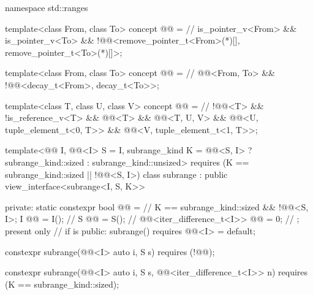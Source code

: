 %
\begin{codeblock}
namespace std::ranges {
  template<class From, class To>
    concept @@ =      // \expos
      is_pointer_v<From> && is_pointer_v<To> &&
      !@@<remove_pointer_t<From>(*)[], remove_pointer_t<To>(*)[]>;

  template<class From, class To>
    concept @@ =                    // \expos
      @@<From, To> &&
      !@@<decay_t<From>, decay_t<To>>;

  template<class T, class U, class V>
    concept @@ =                    // \expos
      !@@<T> && !is_reference_v<T> && @@<T> &&
      @@<T, U, V> &&
      @@<U, tuple_element_t<0, T>> &&
      @@<V, tuple_element_t<1, T>>;

  template<@@ I, @@<I> S = I, subrange_kind K =
      @@<S, I> ? subrange_kind::sized : subrange_kind::unsized>
    requires (K == subrange_kind::sized || !@@<S, I>)
  class subrange : public view_interface<subrange<I, S, K>> {
  private:
    static constexpr bool @@ =                       // \expos
      K == subrange_kind::sized && !@@<S, I>;
    I @@ = I();                                         // \expos
    S @@ = S();                                           // \expos
    @@<iter_difference_t<I>> @@ = 0;   // \expos; present only
                                                            // if  is 
  public:
    subrange() requires @@<I> = default;

    constexpr subrange(@@<I> auto i, S s) requires (!@@);

    constexpr subrange(@@<I> auto i, S s,
                       @@<iter_difference_t<I>> n)
      requires (K == subrange_kind::sized);

}}
\end{codeblock}
